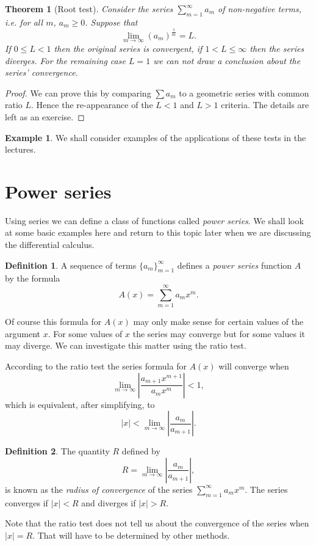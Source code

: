 \documentclass[extrafontsizes, twoside, a4paper]{memoir}
\theoremstyle{plain}%
\newtheorem{thm}{Theorem}[chapter]
\theoremstyle{definition}
\newtheorem{defn}{Definition}[chapter]
\newtheorem{exmp}{Example}[chapter]
\theoremstyle{remark}
\begin{document}
\begin{thm}[Root test]
Consider the series $\sum_{m=1}^\infty a_m$ of non-negative terms, i.e. for all $m$, $a_m \geq 0$. Suppose that
$$\lim_{m \to \infty} \left ( a_m \right )^{\frac{1}{m}} = L .$$
If $0 \leq L < 1$ then the original series is convergent, if $1 < L \leq \infty $ then the series diverges.  For the remaining case $L=1$ we can not draw a conclusion about the series' convergence.
\end{thm}
\begin{proof}
We can prove this by comparing $\sum a_m$ to a geometric series with common ratio $L$. Hence the re-appearance of the $L<1$ and $L>1$ criteria. The details are left as an exercise.
\end{proof}
\begin{exmp}
We shall consider examples of the applications of these tests in the lectures.
\end{exmp}
\section{Power series}
Using series we can define a class of functions called \emph{power series}. We shall look at some basic examples here and return to this topic later when we are discussing the differential calculus.
\begin{defn}
A sequence of terms $\{ a_m \}_{m=1}^\infty$ defines a \emph{power series} function $A$ by the formula
$$ A(x) = \sum_{m=1}^\infty a_m x^m .$$
\end{defn}

Of course this formula for $A(x)$ may only make sense for certain values of the argument $x$. For some values of $x$ the series may converge but for some values it may diverge. We can investigate this matter using the ratio test.

According to the ratio test the series formula for $A(x)$ will converge when
$$ \lim_{m \to \infty} \left | \frac{a_{m+1} x^{m+1}}{a_m x^m} \right | < 1,$$
which is equivalent, after simplifying, to
$$ |x| < \lim_{m \to \infty} \left | \frac{a_m}{a_{m+1}} \right |.$$

\begin{defn}
The quantity $R$ defined by
$$ R = \lim_{m \to \infty} \left | \frac{a_m}{a_{m+1}} \right | ,$$
is known as the \emph{radius of convergence} of the series $\sum_{m=1}^\infty a_m x^m$. The series converges if $|x| < R$ and diverges if $|x| > R$.
\end{defn}

Note that the ratio test does not tell us about the convergence of the series when $|x| =R$. That will have to be determined by other methods.
\end{document}
